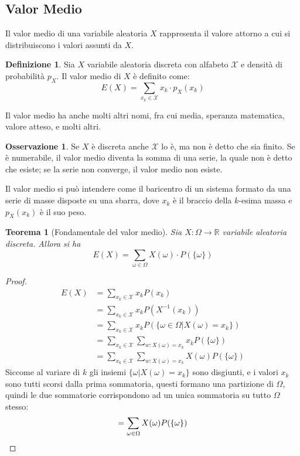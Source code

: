 \documentclass{article}
\theoremstyle{plain}
\newtheorem{teorema}{Teorema}[section]
\theoremstyle{definition}
\newtheorem{definizione}{Definizione}[section]
\newtheorem{osservazione}{Osservazione}[section]
\theoremstyle{remark}
\begin{document}
\subsection{Valor Medio} %
\label{sub:valor_medio}
Il valor medio di una variabile aleatoria $X$ rappresenta il valore attorno a cui si distribuiscono i valori assunti da $X$.
\begin{definizione}
	Sia $X$ variabile aleatoria discreta con alfabeto $\mathcal{X}$ e densità di probabilità $p_X$. Il valor medio di $X$ è definito come:
	\begin{equation*}
		E(X)=\sum_{x_k\in\mathcal{X}} x_k\cdot p_X(x_k)
	\end{equation*}
\end{definizione}
Il valor medio ha anche molti altri nomi, fra cui media, speranza matematica, valore atteso, e molti altri.
\begin{osservazione}
	Se $X$ è discreta anche $\mathcal{X}$ lo è, ma non è detto che sia finito. Se è numerabile, il valor medio diventa la somma di una serie, la quale non è detto che esiste; se la serie non converge, il valor medio non esiste.
\end{osservazione}
Il valor medio si può intendere come il baricentro di un sistema formato da una serie di masse disposte su una sbarra, dove $x_k$ è il braccio della $k$-esima massa e $p_X(x_k)$ è il suo peso.
\begin{teorema}[Fondamentale del valor medio]
	Sia $X:\Omega\to\mathds{R}$ variabile aleatoria discreta. Allora si ha
	\begin{equation*}
		E(X)=\sum_{\omega\in\Omega} X(\omega)\cdot P(\{\omega\})
	\end{equation*}
\end{teorema}
\begin{proof}
	\begin{align*}
		E(X)&=\sum_{x_k\in\mathcal{X}}x_kP(x_k)\\
		&=\sum_{x_k\in\mathcal{X}}x_kP(X^{-1}(x_k))\\
		&=\sum_{x_k\in\mathcal{X}}x_kP(\{\omega\in\Omega|X(\omega)=x_k\})\\
		&=\sum_{x_k\in\mathcal{X}}\sum_{w:X(\omega)=x_k}x_kP(\{\omega\})\\
		&=\sum_{x_k\in\mathcal{X}}\sum_{w:X(\omega)=x_k}X(\omega)P(\{\omega\})
	\end{align*}
	Siccome al variare di $k$ gli insiemi $\{\omega|X(\omega)=x_k\}$ sono disgiunti, e i valori $x_k$ sono tutti scorsi dalla prima sommatoria, questi formano una partizione di $\Omega$, quindi le due sommatorie corrispondono ad un unica sommatoria su tutto $\Omega$ stesso:
	\begin{equation*}
		=\sum_{\omega\in\Omega}X(\omega)P(\{\omega\})\qedhere
	\end{equation*}
\end{proof}
\end{document}
